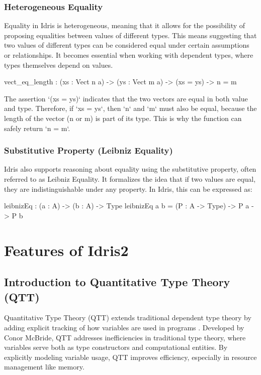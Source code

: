 \documentclass[]{rptuseminar}
\begin{document}
\subsubsection{Heterogeneous Equality}
Equality in Idris is heterogeneous, meaning that it allows for the possibility of proposing equalities between values of different types. This means suggesting that two values of different types can be considered equal under certain assumptions or relationships. It becomes essential when working with dependent types, where types themselves depend on values.

\begin{idris}
vect_eq_length : (xs : Vect n a) -> (ys : Vect m a) ->
(xs = ys) -> n = m 
\end{idris}

The assertion `(xs = ys)` indicates that the two vectors are equal in both value and type. Therefore, if `xs = ys`, then `n` and `m` must also be equal, because the length of the vector (n or m) is part of its type. This is why the function can safely return `n = m`.

\subsubsection{Substitutive Property (Leibniz Equality)}
Idris also supports reasoning about equality using the substitutive property, often referred to as Leibniz Equality. It formalizes the idea that if two values are equal, they are indistinguishable under any property. In Idris, this can be expressed as:

\begin{idris}
leibnizEq : (a : A) -> (b : A) -> Type
leibnizEq a b = (P : A -> Type) -> P a -> P b
\end{idris}
\section{Features of Idris2}  
\label{sec:features}

\subsection{Introduction to Quantitative Type Theory (QTT)}
Quantitative Type Theory (QTT) extends traditional dependent type theory by adding explicit tracking of how variables are used in programs \cite{atkey2018syntax}. Developed by Conor McBride, QTT addresses inefficiencies in traditional type theory, where variables serve both as type constructors and computational entities. By explicitly modeling variable usage, QTT improves efficiency, especially in resource management like memory.
\end{document}
